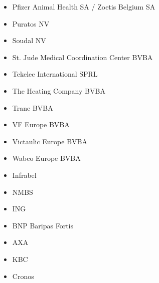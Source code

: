 \documentclass[]{article}
\begin{document}
\begin{itemize}
	\item Pfizer Animal Health SA / Zoetis Belgium SA
	\item Puratos NV
	\item Soudal NV
	\item St. Jude Medical Coordination Center BVBA
	\item Tekelec International SPRL
	\item The Heating Company BVBA
	\item Trane BVBA
	\item VF Europe BVBA
	\item Victaulic Europe BVBA
	\item Wabco Europe BVBA
	\item Infrabel
	\item NMBS
	\item ING
	\item BNP Baripas Fortis
	\item AXA
	\item KBC
	\item Cronos
	
	
\end{itemize}

\nocite{*}
\printbibliography
\end{document}

